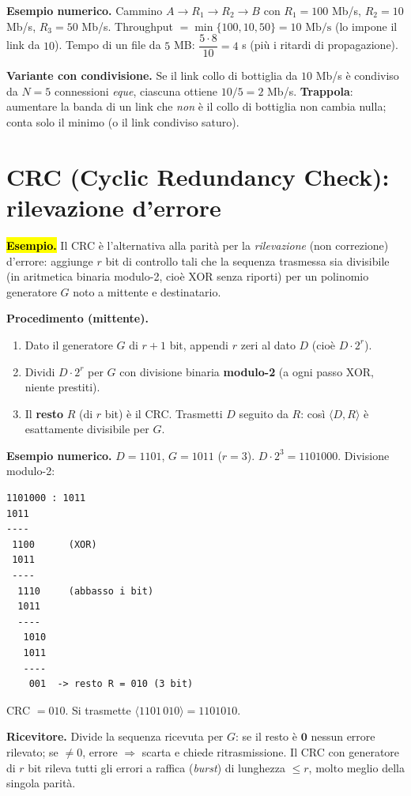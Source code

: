 \documentclass[11pt,a4paper]{report}
\begin{document}
\textbf{Esempio numerico.} Cammino $A\to R_1\to R_2\to B$ con
$R_1\!=\!100$ Mb/s, $R_2\!=\!10$ Mb/s, $R_3\!=\!50$ Mb/s. Throughput
$=\min\{100,10,50\}=\boxed{10 \text{ Mb/s}}$ (lo impone il link da $10$). Tempo di
un file da $5$ MB: $\dfrac{5\cdot 8}{10}=4$ s (più i ritardi di propagazione).

\textbf{Variante con condivisione.} Se il link collo di bottiglia da $10$ Mb/s è
condiviso da $N=5$ connessioni \emph{eque}, ciascuna ottiene $10/5=2$ Mb/s.
\textbf{Trappola}: aumentare la banda di un link che \emph{non} è il collo di
bottiglia non cambia nulla; conta solo il minimo (o il link condiviso saturo).

\section{CRC (Cyclic Redundancy Check): rilevazione d'errore}
\label{teoria:crc}
\hl{\textbf{Esempio.}} Il CRC è l'alternativa alla parità per la
\emph{rilevazione} (non correzione) d'errore: aggiunge $r$ bit di controllo tali
che la sequenza trasmessa sia divisibile (in aritmetica binaria modulo-2, cioè
XOR senza riporti) per un polinomio generatore $G$ noto a mittente e
destinatario.

\textbf{Procedimento (mittente).}
\begin{enumerate}[noitemsep]
\item Dato il generatore $G$ di $r{+}1$ bit, appendi $r$ zeri al dato $D$
(cioè $D\cdot 2^r$).
\item Dividi $D\cdot 2^r$ per $G$ con divisione binaria \textbf{modulo-2} (a ogni
passo XOR, niente prestiti).
\item Il \textbf{resto} $R$ (di $r$ bit) è il CRC. Trasmetti $D$ seguito da $R$:
così $\langle D, R\rangle$ è esattamente divisibile per $G$.
\end{enumerate}

\textbf{Esempio numerico.} $D=1101$, $G=1011$ ($r=3$). $D\cdot 2^3 = 1101000$.
Divisione modulo-2:
\begin{verbatim}
1101000 : 1011
1011
----
 1100      (XOR)
 1011
 ----
  1110     (abbasso i bit)
  1011
  ----
   1010
   1011
   ----
    001  -> resto R = 010 (3 bit)
\end{verbatim}
CRC $=010$. Si trasmette $\langle 1101\,010\rangle = 1101010$.

\textbf{Ricevitore.} Divide la sequenza ricevuta per $G$: se il resto è
$\mathbf{0}$ nessun errore rilevato; se $\neq 0$, errore $\Rightarrow$ scarta e
chiede ritrasmissione. Il CRC con generatore di $r$ bit rileva tutti gli errori
a raffica (\emph{burst}) di lunghezza $\le r$, molto meglio della singola parità.
\end{document}
